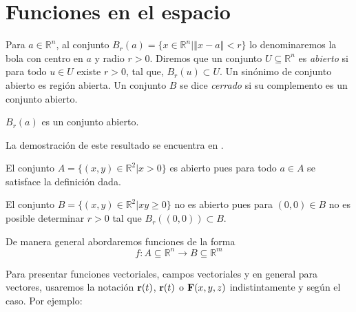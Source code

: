 \section{Funciones en el espacio} \label{funcionesenelespacio}
Para $a\in \mathbb{R}^{n}$, al conjunto $B_{r}\left(a\right) =\{x\in \mathbb{R}^{n}|\left\Vert x-a\right\Vert <r\}$
lo denominaremos la bola con centro en $a$ y radio $r>0$. 
Diremos que un conjunto $U\subseteq \mathbb{R}^{n}$ es \emph{abierto} si para todo $u\in U$
existe $r>0$, tal que, $B_{r}(u) \subset U$.  
Un sinónimo de conjunto abierto es región abierta. 
Un conjunto $B$ se dice \emph{cerrado} si su complemento es un conjunto abierto. 
\begin{teorema}
  $B_{r}(a)$ es un conjunto abierto.
\end{teorema}
La demostración de este resultado se encuentra en \textcite{marsden_calculo_2013}.
\begin{ejemplo}
  El conjunto $A=\{(x,y) \in \mathbb{R}^{2}|x>0\}$ es abierto pues
  para todo $a \in A$ se satisface la definición dada.

  El conjunto $B=\{(x,y) \in \mathbb{R}^{2}|xy\geq 0\}$ no es abierto pues
  para $\left( 0,0\right) \in B$ no es posible determinar
  $r>0$ tal que $B_{r}\left( \left( 0,0\right) \right) \subset B$.
\end{ejemplo}
De manera general abordaremos funciones de la forma
\begin{equation}
  f: A\subseteq \mathbb{R}^n \to B\subseteq \mathbb{R}^m
\end{equation}

Para presentar funciones vectoriales, campos vectoriales y en general para vectores, usaremos la notación $\mathbf{r}(t)$, ${\bf r}(t)$ o ${\bf F}(x,y,z)$ indistintamente y según el caso.
Por ejemplo:

